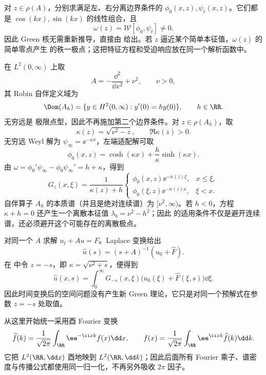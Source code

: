 \begin{exbox}\label{ex:math-sl-green-robin-constant}
对 $z\in\rho(A)$，分别求满足左、右分离边界条件的 $\phi_0(x,z),\psi_\ell(x,z)$。它们都是 $\cos(kx),\sin(kx)$ 的线性组合，且
\[
 \omega(z)=\mathcal W[\phi_0,\psi_\ell]\neq0.
\]
因此 Green 核无需重新推导，直接由 给出。若 $z$ 逼近某个简单本征值，$\omega(z)$ 的简单零点产生 的秩一极点；这把特征方程和受迫响应放在同一个解析函数中。
\end{exbox}
\begin{exbox}[半直线常势算子的预解式核]\label{ex:math-sl-halfline-resolvent}
在 $L^2(0,\infty)$ 上取
\[
 A=-\frac{\dd^2}{\dd x^2}+\nu^2,
 \qquad \nu>0,
\]
其 Robin 自伴定义域为
\[
 \Dom(A_h)=\{y\in H^2(0,\infty):y'(0)=hy(0)\},
 \qquad h\in\RR.
\]
无穷远是 极限点型，因此不再施加第二个边界条件。对 $z\in\rho(A_h)$，取
\[
 \kappa(z)=\sqrt{\nu^2-z},\qquad \Re\kappa(z)>0.
\]
无穷远 Weyl 解为 $\psi_\infty=\ee^{-\kappa x}$，左端适配解可取
\[
 \phi_0(x,z)=\cosh(\kappa x)+\frac{h}{\kappa}\sinh(\kappa x).
\]
由 $\omega=\phi_0'\psi_\infty-\phi_0\psi_\infty'=h+\kappa$，得到
\begin{equation}\label{eq:math-sl-halfline-explicit-green}
 G_z(x,\xi)=\frac{1}{\kappa(z)+h}
 \begin{cases}
 \phi_0(x,z)\ee^{-\kappa(z)\xi},&x\le\xi,\\
 \phi_0(\xi,z)\ee^{-\kappa(z)x},&\xi<x.
 \end{cases}
\end{equation}
自伴算子 $A_h$ 的本质谱（并且是绝对连续谱）为 $[\nu^2,\infty)$。若 $h<0$，方程 $\kappa+h=0$ 还产生一个离散本征值 $\lambda_b=\nu^2-h^2$；因此 的适用条件不仅是避开连续谱，还必须避开这个可能存在的离散极点。
\end{exbox}

\begin{exbox}\label{ex:math-sl-laplace-green-halfline}
对同一个 $A$ 求解 $u_t+Au=F$。Laplace 变换给出
\[
 \widehat u(s)=(s+A)^{-1}(u_0+\widehat F).
\]
在 中令 $z=-s$，即 $\kappa=\sqrt{\nu^2+s}$，便得到
\[
 \widehat u(x,s)=\int_0^\infty G_{-s}(x,\xi)
 \bigl(u_0(\xi)+\widehat F(\xi,s)\bigr)\dd\xi.
\]
因此时间变换后的空间问题没有产生新 Green 理论，它只是对同一个预解式在参数 $z=-s$ 处取值。
\end{exbox}
从这里开始统一采用酉 Fourier 变换
\begin{equation}\label{eq:math-sl-unitary-fourier-convention}
 \widehat f(k)=\frac{1}{\sqrt{2\pi}}
 \int_{\RR}\ee^{-\ii xk}f(x)\dd x,
 \qquad
 f(x)=\frac{1}{\sqrt{2\pi}}
 \int_{\RR}\ee^{\ii xk}\widehat f(k)\dd k.
\end{equation}
它把 $L^2(\RR,\dd x)$ 酉地映到 $L^2(\RR,\dd k)$；因此后面所有 Fourier 乘子、谱密度与传播公式都使用同一归一化，不再另外吸收 $2\pi$ 因子。


